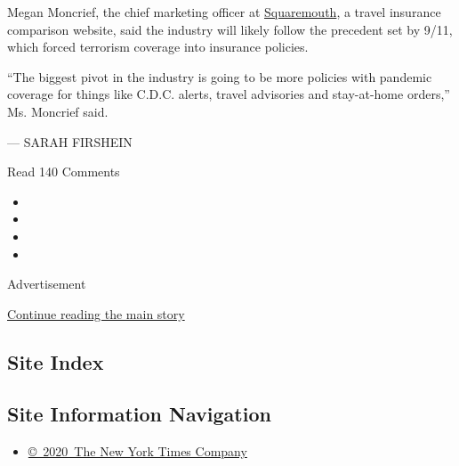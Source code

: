 Megan Moncrief, the chief marketing officer at
\href{https://www.squaremouth.com/}{Squaremouth}, a travel insurance
comparison website, said the industry will likely follow the precedent
set by 9/11, which forced terrorism coverage into insurance policies.

``The biggest pivot in the industry is going to be more policies with
pandemic coverage for things like C.D.C. alerts, travel advisories and
stay-at-home orders,'' Ms. Moncrief said.

--- SARAH FIRSHEIN

Read 140 Comments

\begin{itemize}
\item
\item
\item
\item
\end{itemize}

Advertisement

\protect\hyperlink{after-bottom}{Continue reading the main story}

\hypertarget{site-index}{%
\subsection{Site Index}\label{site-index}}

\hypertarget{site-information-navigation}{%
\subsection{Site Information
Navigation}\label{site-information-navigation}}

\begin{itemize}
\tightlist
\item
  \href{https://help.nytimes3xbfgragh.onion/hc/en-us/articles/115014792127-Copyright-notice}{©~2020~The
  New York Times Company}
\end{itemize}

